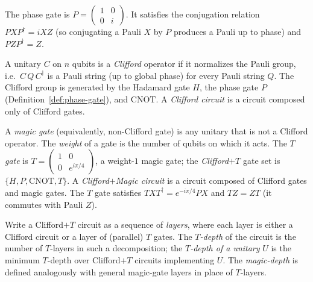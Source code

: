 \begin{definition}
  \label{def:phase-gate}
  The phase gate is $P = \begin{pmatrix} 1 & 0 \\ 0 & i \end{pmatrix}$. It
  satisfies the conjugation relation $P X P^\dagger = i X Z$ (so conjugating a
  Pauli $X$ by $P$ produces a Pauli up to phase) and $PZP^\dagger = Z$.
\end{definition}

\begin{definition}
  \label{def:clifford}
  A unitary $C$ on $n$ qubits is a \emph{Clifford} operator if it normalizes the
  Pauli group, i.e.\ $C\,Q\,C^\dagger$ is a Pauli string (up to global phase) for
  every Pauli string $Q$. The Clifford group is generated by the Hadamard gate
  $H$, the phase gate $P$ (Definition~\ref{def:phase-gate}), and $\mathrm{CNOT}$.
  A \emph{Clifford circuit} is a circuit composed only of Clifford gates.
\end{definition}

\begin{definition}
  \label{def:magic-gate}
  A \emph{magic gate} (equivalently, non-Clifford gate) is any unitary that is
  not a Clifford operator. The \emph{weight} of a gate is the number of qubits on
  which it acts. The \emph{$T$ gate} is
  $T = \begin{pmatrix} 1 & 0 \\ 0 & e^{i\pi/4}\end{pmatrix}$, a weight-$1$ magic
  gate; the \emph{Clifford$+T$} gate set is $\{H,P,\mathrm{CNOT},T\}$. A
  \emph{Clifford$+$Magic circuit} is a circuit composed of Clifford gates and
  magic gates. The $T$ gate satisfies $T X T^\dagger = e^{-i\pi/4} P X$ and
  $TZ = ZT$ (it commutes with Pauli $Z$).
\end{definition}

\begin{definition}
  \label{def:tdepth}
  Write a Clifford$+T$ circuit as a sequence of \emph{layers}, where each layer
  is either a Clifford circuit or a layer of (parallel) $T$ gates. The
  \emph{$T$-depth} of the circuit is the number of $T$-layers in such a
  decomposition; the \emph{$T$-depth of a unitary} $U$ is the minimum $T$-depth
  over Clifford$+T$ circuits implementing $U$. The \emph{magic-depth} is defined
  analogously with general magic-gate layers in place of $T$-layers.
\end{definition}

